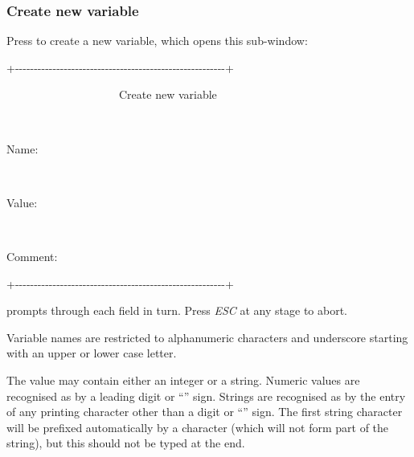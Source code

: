 \subsubsection{Create new variable}
Press  to create a new variable, which opens
this sub-window:

\begin{exparasmall}

+-{}-{}-{}-{}-{}-{}-{}-{}-{}-{}-{}-{}-{}-{}-{}-{}-{}-{}-{}-{}-{}-{}-{}-{}-{}-{}-{}-{}-{}-{}-{}-{}-{}-{}-{}-{}-{}-{}-{}-{}-{}-{}-{}-{}-{}-{}-{}-{}-{}-{}-{}-{}-{}-{}-{}-+

{\textbar} \ \ \ \ \ \ \ \ \ \ \ \ \ \ \ \ \ \ \ \ Create new variable
\ \ \ \ \ \ \ \ \ \ \ \ \ \ \ {\textbar}

{\textbar}
\ \ \ \ \ \ \ \ \ \ \ \ \ \ \ \ \ \ \ \ \ \ \ \ \ \ \ \ \ \ \ \ \ \ \ \ \ \ \ \ \ \ \ \ \ \ \ \ \ \ \ \ \ \ \ {\textbar}

{\textbar}Name:
\ \ \ \ \ \ \ \ \ \ \ \ \ \ \ \ \ \ \ \ \ \ \ \ \ \ \ \ \ \ \ \ \ \ \ \ \ \ \ \ \ \ \ \ \ \ \ \ \ {\textbar}

{\textbar}
\ \ \ \ \ \ \ \ \ \ \ \ \ \ \ \ \ \ \ \ \ \ \ \ \ \ \ \ \ \ \ \ \ \ \ \ \ \ \ \ \ \ \ \ \ \ \ \ \ \ \ \ \ \ \ {\textbar}

{\textbar}Value:
\ \ \ \ \ \ \ \ \ \ \ \ \ \ \ \ \ \ \ \ \ \ \ \ \ \ \ \ \ \ \ \ \ \ \ \ \ \ \ \ \ \ \ \ \ \ \ \ {\textbar}

{\textbar}
\ \ \ \ \ \ \ \ \ \ \ \ \ \ \ \ \ \ \ \ \ \ \ \ \ \ \ \ \ \ \ \ \ \ \ \ \ \ \ \ \ \ \ \ \ \ \ \ \ \ \ \ \ \ \ {\textbar}

{\textbar}Comment:
\ \ \ \ \ \ \ \ \ \ \ \ \ \ \ \ \ \ \ \ \ \ \ \ \ \ \ \ \ \ \ \ \ \ \ \ \ \ \ \ \ \ \ \ \ \ {\textbar}

+-{}-{}-{}-{}-{}-{}-{}-{}-{}-{}-{}-{}-{}-{}-{}-{}-{}-{}-{}-{}-{}-{}-{}-{}-{}-{}-{}-{}-{}-{}-{}-{}-{}-{}-{}-{}-{}-{}-{}-{}-{}-{}-{}-{}-{}-{}-{}-{}-{}-{}-{}-{}-{}-{}-{}-+

\end{exparasmall}

\PrBtq{} prompts through each field in turn. Press
\textit{ESC} at any stage to abort.

Variable names are restricted to alphanumeric characters and underscore
starting with an upper or lower case letter.

The value may contain either an integer or a string. Numeric values are
recognised as by a leading digit or
``\exampletext{{}-}'' sign. Strings
are recognised as by the entry of any printing character other than a
digit or ``\exampletext{{}-}'' sign.
The first string character will be prefixed automatically by a
\exampletext{{\textquotedbl}} character (which will not form
part of the string), but this should not be typed at the end.

